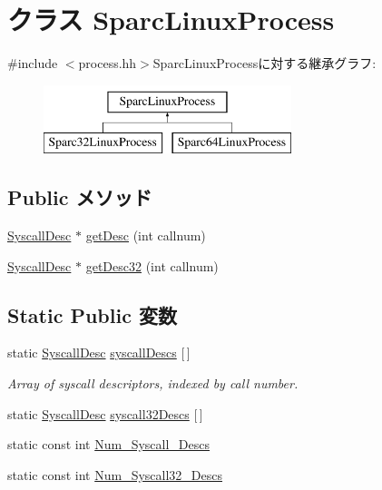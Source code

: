 \hypertarget{classSparcISA_1_1SparcLinuxProcess}{
\section{クラス SparcLinuxProcess}
\label{classSparcISA_1_1SparcLinuxProcess}
}


{\ttfamily \#include $<$process.hh$>$}SparcLinuxProcessに対する継承グラフ:\begin{figure}[H]
\begin{center}
\leavevmode
\includegraphics[height=2cm]{classSparcISA_1_1SparcLinuxProcess}
\end{center}
\end{figure}
\subsection*{Public メソッド}
\begin{DoxyCompactItemize}
\item 
\hyperlink{classSyscallDesc}{SyscallDesc} $\ast$ \hyperlink{classSparcISA_1_1SparcLinuxProcess_aebbff609a7235342925445690acf5ee8}{getDesc} (int callnum)
\item 
\hyperlink{classSyscallDesc}{SyscallDesc} $\ast$ \hyperlink{classSparcISA_1_1SparcLinuxProcess_a5257a4aa8be7f323692245bc9de5bfa9}{getDesc32} (int callnum)
\end{DoxyCompactItemize}
\subsection*{Static Public 変数}
\begin{DoxyCompactItemize}
\item 
static \hyperlink{classSyscallDesc}{SyscallDesc} \hyperlink{classSparcISA_1_1SparcLinuxProcess_a08d67a94820b75842e07f030e548372e}{syscallDescs} \mbox{[}$\,$\mbox{]}
\begin{DoxyCompactList}\small\item\em Array of syscall descriptors, indexed by call number. \item\end{DoxyCompactList}\item 
static \hyperlink{classSyscallDesc}{SyscallDesc} \hyperlink{classSparcISA_1_1SparcLinuxProcess_a4b8a4b07a602fcc993b7f31369190958}{syscall32Descs} \mbox{[}$\,$\mbox{]}
\item 
static const int \hyperlink{classSparcISA_1_1SparcLinuxProcess_a9534988905c6f5c8c57c4b6a7b179fea}{Num\_\-Syscall\_\-Descs}
\item 
static const int \hyperlink{classSparcISA_1_1SparcLinuxProcess_a0a786b34a677f6bb8f067ec80cfdb873}{Num\_\-Syscall32\_\-Descs}
\end{DoxyCompactItemize}


